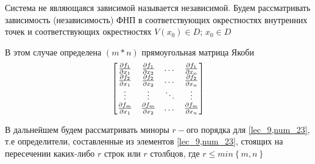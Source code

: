 \documentclass[../../main.tex]{subfiles}
\begin{document}
Система не являющаяся зависимой называется независимой.
Будем рассматривать зависимость (независимость) ФНП
в соответствующих окрестностях внутренних точек и 
соответствующих окрестностях 
$V(x_0) \in D$; $x_0 \in D$

В этом случае определена $\left(m*n\right)$ 
прямоугольная матрица Якоби
\begin{equation}
 \label{lec_9,num_23}
 \begin{bmatrix}
        \frac{\partial f_1}{\partial x_1} 
        & \frac{\partial f_1}{\partial x_2} & \dots & 
        \frac{\partial f_1}{\partial x_n} \\
        \frac{\partial f_2}{\partial x_1} & \frac{\partial f_2}{\partial x_2} &\dots & 
        \frac{\partial f_2}{\partial x_n} \\
        \vdots & \vdots & \ddots & \vdots \\
        \frac{\partial f_m}{\partial x_1} & \frac{\partial f_m}{\partial x_2} & \dots & 
        \frac{\partial f_m}{\partial x_n} 
    \end{bmatrix}
\end{equation}

В дальнейшем будем рассматривать миноры $r-$ого порядка
для \eqref{lec_9,num_23}, т.е определители, 
составленные из элементов \eqref{lec_9,num_23}, 
стоящих на пересечении каких-либо $r$ строк или 
$r$ столбцов, где 
$r \leq min\left\{ m, n\right\}$
\end{document}
